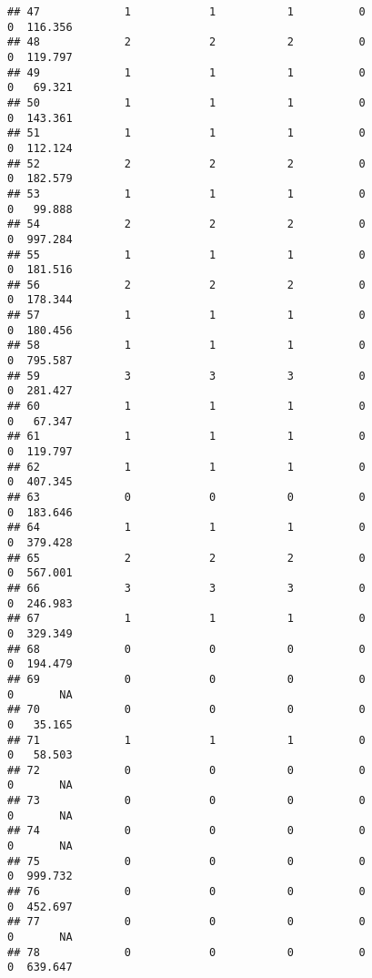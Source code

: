 \documentclass[
]{article}
\begin{document}
\begin{verbatim}
## 47             1            1           1          0                0  116.356
## 48             2            2           2          0                0  119.797
## 49             1            1           1          0                0   69.321
## 50             1            1           1          0                0  143.361
## 51             1            1           1          0                0  112.124
## 52             2            2           2          0                0  182.579
## 53             1            1           1          0                0   99.888
## 54             2            2           2          0                0  997.284
## 55             1            1           1          0                0  181.516
## 56             2            2           2          0                0  178.344
## 57             1            1           1          0                0  180.456
## 58             1            1           1          0                0  795.587
## 59             3            3           3          0                0  281.427
## 60             1            1           1          0                0   67.347
## 61             1            1           1          0                0  119.797
## 62             1            1           1          0                0  407.345
## 63             0            0           0          0                0  183.646
## 64             1            1           1          0                0  379.428
## 65             2            2           2          0                0  567.001
## 66             3            3           3          0                0  246.983
## 67             1            1           1          0                0  329.349
## 68             0            0           0          0                0  194.479
## 69             0            0           0          0                0       NA
## 70             0            0           0          0                0   35.165
## 71             1            1           1          0                0   58.503
## 72             0            0           0          0                0       NA
## 73             0            0           0          0                0       NA
## 74             0            0           0          0                0       NA
## 75             0            0           0          0                0  999.732
## 76             0            0           0          0                0  452.697
## 77             0            0           0          0                0       NA
## 78             0            0           0          0                0  639.647

\end{verbatim}
\end{document}
